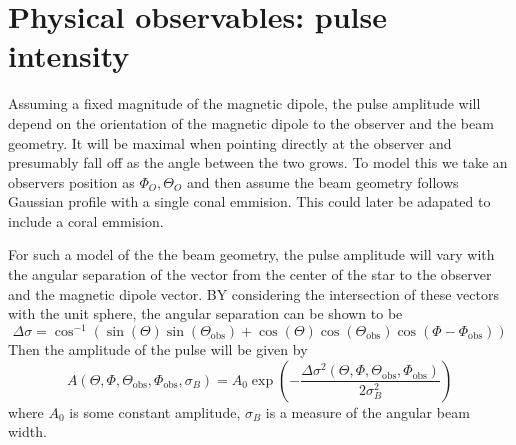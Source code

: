 \documentclass[../full_thesis/full_thesis.tex]{subfiles}
\begin{document}


\section{Physical observables: pulse intensity}
\label{sec: intensity}
Assuming a fixed magnitude of the magnetic dipole, the pulse amplitude will
depend on the orientation of the magnetic dipole to the observer and the
beam geometry. It will be
maximal when pointing directly at the observer and presumably fall off as the
angle between the two grows. To model this we take an observers position as
$\Phi_{O}, \Theta_{O}$ and then assume the beam geometry follows
Gaussian profile with a single conal emmision. This could later be adapated
to include a coral emmision.

For such a model of the the beam geometry, the pulse amplitude will vary with the
angular separation of the vector from the center of the star to the observer and the
magnetic dipole vector. BY considering the intersection of these vectors with
the unit sphere, the angular separation can be shown to be
\newcommand{\ThetaO}{\Theta_{\mathrm{obs}}}
\newcommand{\PhiO}{\Phi_{\mathrm{obs}}}
\newcommand{\sigmaB}{\sigma_{B}}
\begin{equation}
\Delta\sigma = \cos^{-1}\left(\sin(\Theta)\sin(\ThetaO) +
                             \cos(\Theta)\cos(\ThetaO)\cos(\Phi - \PhiO)\right)
\label{eqn: angular sep inv cos}
\end{equation}
Then the amplitude of the pulse will be given by
\begin{equation}
A(\Theta, \Phi, \ThetaO, \PhiO, \sigmaB) =
A_{0} \exp\left(-\frac{\Delta\sigma^{2}(\Theta, \Phi, \ThetaO, \PhiO)}{2\sigmaB^{2}}\right)
\label{eqn: beam amplitude}
\end{equation}
where $A_{0}$ is some constant amplitude, $\sigmaB$ is a measure of the
angular beam width.
\end{document}
